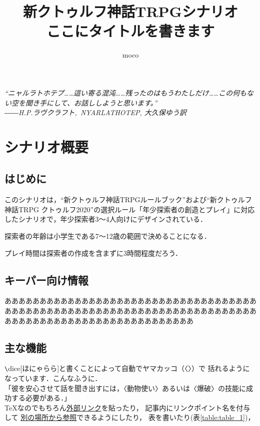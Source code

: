 \documentclass[twocolumn, lualatex, ja=standard]{bxjsarticle}
\title{新クトゥルフ神話TRPGシナリオ\\
ここにタイトルを書きます}
\author{moco}
\date{}
\newcommand{\dice}[1][目星]{〈#1〉}
\begin{document}
\maketitle %
\textit{``ニャルラトホテプ……這い寄る混沌……残ったのはもうわたしだけ……この何もない空を聞き手にして、お話ししようと思います。''\\――H.P.ラヴクラフト,\ NYARLATHOTEP, 大久保ゆう訳}

\tableofcontents %

\section{シナリオ概要}
\subsection{はじめに}
このシナリオは，``新クトゥルフ神話TRPGルールブック''および``新クトゥルフ神話TRPG クトゥルフ2020''の選択ルール「年少探索者の創造とプレイ」に対応したシナリオで，年少探索者3〜4人向けにデザインされている．

探索者の年齢は小学生である7〜12歳の範囲で決めることになる．

プレイ時間は探索者の作成を含まずに3時間程度だろう．

\subsection{キーパー向け情報}
あああああああああああああああああああああああああああああああああああああああああああああああああああああああああああああああああああああああああああああああああああああああああああああああああああ

\subsection{主な機能}

\verb|\|dice[ほにゃらら]と書くことによって自動でヤマカッコ（〈〉）で
括れるようになっています．こんなふうに．\\

「彼を安心させて話を聞き出すには，\dice[動物使い]あるいは\dice[爆破]の技能に成功する必要がある．」\\

\TeX なのでもちろん\href{https://google.com}{外部リンク}を貼ったり，
\hypertarget{link1}{記事内にリンクポイント名を付与して}
\hyperlink{link1}{別の場所から参照}できるようにしたり，
表を書いたり(表\ref{table:table_1})，
\end{document}
